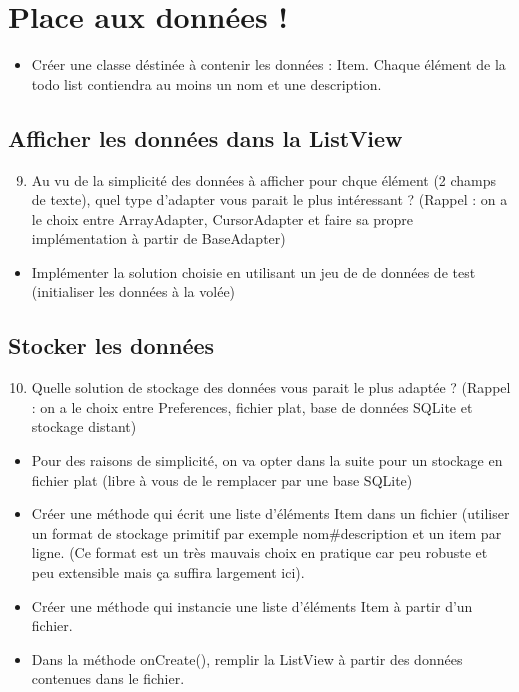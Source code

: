 \documentclass{article}
\begin{document}
 \section{Place aux données !}
 \begin{itemize}
  \item Créer une classe déstinée à contenir les données : Item. Chaque élément de la todo list contiendra au moins un nom et une description.
 \end{itemize}
 \subsection{Afficher les données dans la ListView}
   \begin{enumerate}
 \setcounter{enumi}{8}
\item Au vu de la simplicité des données à afficher pour chque élément (2 champs de texte), quel type d'adapter vous parait le plus intéressant ? 
(Rappel : on a le choix entre ArrayAdapter, CursorAdapter et faire sa propre implémentation à partir de BaseAdapter)
\end{enumerate}
 \begin{itemize}
  \item Implémenter la solution choisie en utilisant un jeu de de données de test (initialiser les données à la volée)
 \end{itemize}
  \subsection{Stocker les données}
  \begin{enumerate}
 \setcounter{enumi}{9}
\item Quelle solution de stockage des données vous parait le plus adaptée ? (Rappel : on a le choix entre Preferences, fichier plat, base de données SQLite et stockage distant)
\end{enumerate}
 \begin{itemize}
  \item Pour des raisons de simplicité, on va opter dans la suite pour un stockage en fichier plat (libre à vous de le remplacer par une base SQLite)
  \item Créer une méthode qui écrit une liste d'éléments Item dans un fichier (utiliser un format de stockage primitif par exemple nom\#description et un item par ligne. (Ce format est un très mauvais choix en pratique car peu robuste et peu extensible mais ça suffira largement ici).
  \item Créer une méthode qui instancie une liste d'éléments Item à partir d'un fichier.
  \item Dans la méthode onCreate(), remplir la ListView à partir des données contenues dans le fichier.
 \end{itemize}
\end{document}
